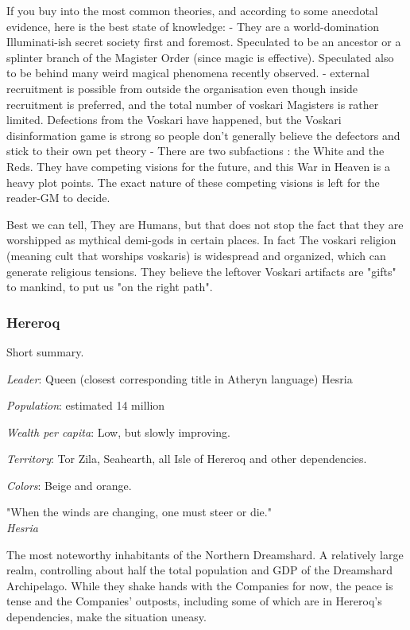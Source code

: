 If you buy into the most common theories, and according to some anecdotal evidence, here is the best state of knowledge: 
    - They are a world-domination Illuminati-ish secret society first and foremost. Speculated to be an ancestor or a splinter branch of the Magister Order (since magic is effective). Speculated also to be behind many weird magical phenomena recently observed.
    - external recruitment is possible from outside the organisation even though inside recruitment is preferred, and the total number of voskari Magisters is rather limited. Defections from the Voskari have happened, but the Voskari disinformation game is strong so people don't generally believe the defectors and stick to their own pet theory
    - There are two subfactions : the White and the Reds. They have competing visions for the future, and this War in Heaven is a heavy plot points. The exact nature of these competing visions is left for the reader-GM to decide.

Best we can tell, They are Humans, but that does not stop the fact that they are worshipped as mythical demi-gods in certain places. In fact The voskari religion (meaning cult that worships voskaris) is widespread and organized, which can generate religious tensions. They believe the leftover Voskari artifacts are "gifts" to mankind, to put us "on the right path". 


\subsubsection{Hereroq}


Short summary.


\textit{Leader}: Queen (closest corresponding title in Atheryn language) Hesria

\textit{Population}: estimated 14 million

\textit{Wealth per capita}: Low, but slowly improving.

\textit{Territory}: Tor Zila, Seahearth, all Isle of Hereroq and other dependencies.
    
\textit{Colors}: Beige and orange.


\begin{rpg-quotebox}
    "When the winds are changing, one must steer or die." \\ \textendash \textit{Hesria}
\end{rpg-quotebox}


The most noteworthy inhabitants of the Northern Dreamshard. A relatively large realm, controlling about half the total population and GDP of the Dreamshard Archipelago. While they shake hands with the Companies for now, the peace is tense and the Companies' outposts, including some of which are in Hereroq's dependencies, make the situation uneasy.

